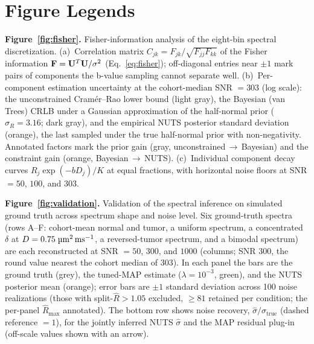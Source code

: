 \section*{Figure Legends}

\noindent\textbf{Figure~\ref{fig:fisher}.}
Fisher-information analysis of the eight-bin spectral discretization.
(a)~Correlation matrix $C_{jk} = F_{jk}/\sqrt{F_{jj}F_{kk}}$ of the Fisher
information $\mathbf{F} = \mathbf{U}^T\mathbf{U}/\sigma^2$ (Eq.~\ref{eq:fisher}); off-diagonal
entries near $\pm 1$ mark pairs of components the b-value sampling cannot separate well.
(b)~Per-component estimation uncertainty at the cohort-median SNR $= 303$
(log scale): the unconstrained Cram\'er--Rao lower bound (light gray), the
Bayesian (van Trees) CRLB under a Gaussian approximation of the half-normal
prior ($\sigma_R = 3.16$; dark gray), and the empirical NUTS posterior standard
deviation (orange), the last sampled under the true half-normal prior with
non-negativity. Annotated factors mark the prior gain
(gray, unconstrained\,$\to$\,Bayesian) and the constraint gain
(orange, Bayesian\,$\to$\,NUTS).
(c)~Individual component decay curves $R_j \exp(-bD_j)/K$ at equal fractions,
with horizontal noise floors at SNR $= 50$, $100$, and $303$.

\medskip\noindent\textbf{Figure~\ref{fig:validation}.}
Validation of the spectral inference on simulated ground truth across spectrum
shape and noise level.
Six ground-truth spectra (rows A--F: cohort-mean normal and tumor, a uniform
spectrum, a concentrated $\delta$ at $D = 0.75\;\si{\micro\meter\squared\per\milli\second}$, a reversed-tumor
spectrum, and a bimodal spectrum) are each reconstructed at SNR $= 50$, $300$,
and $1000$ (columns; SNR $300$, the round value nearest the cohort median of $303$).
In each panel the bars are the ground truth (grey), the tuned-MAP estimate
($\lambda = 10^{-3}$, green), and the NUTS posterior mean (orange); error bars
are $\pm 1$ standard deviation across 100 noise realizations (those with
split-$\hat{R} > 1.05$ excluded, $\geq 81$ retained per condition; the per-panel
$\hat{R}_{\max}$ annotated).
The bottom row shows noise recovery, $\hat{\sigma}/\sigma_{\mathrm{true}}$
(dashed reference $= 1$), for the jointly inferred NUTS $\hat{\sigma}$ and the
MAP residual plug-in (off-scale values shown with an arrow).

